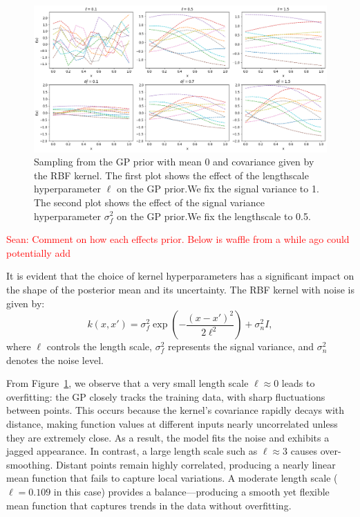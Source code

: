 \documentclass{article}
\newcommand{\Sean}[1]{{\textcolor{red}{{Sean: #1}} }}
\begin{document}
\begin{figure}[H]
    \centering
        \includegraphics[width=\textwidth]{LatexPlots/1dplots/Kernel_hyperparams.png}
        \caption{Sampling from the GP prior with mean 0 and covariance given by the RBF kernel.
        The first plot shows the effect of the lengthscale hyperparameter \(\ell\) on the GP prior.We fix the signal variance to 1.
        The second plot shows the effect of the signal variance hyperparameter \(\sigma_f^2\) on the GP prior.We fix the lengthscale to 0.5.}
    \label{fig: GPprior_hyperparams}
\end{figure}

\Sean{Comment on how each effects prior. Below is waffle from a while ago could potentially add}

\noindent
It is evident that the choice of kernel hyperparameters has a significant impact on the shape of the posterior mean and its uncertainty.
The RBF kernel with noise is given by:
\[
k(x, x') = \sigma_f^2 \exp\left( -\frac{(x - x')^2}{2\ell^2} \right) + \sigma_n^2 I,
\]
where $\ell$ controls the length scale, $\sigma_f^2$ represents the signal variance, and $\sigma_n^2$ denotes the noise level.

\noindent
From Figure~\ref{fig: GPprior_hyperparams}, we observe that a very small length scale $\ell \approx 0$ leads to overfitting:
the GP closely tracks the training data, with sharp fluctuations between points. This occurs because the kernel's covariance rapidly decays with distance,
making function values at different inputs nearly uncorrelated unless they are extremely close. As a result, the model fits the noise and exhibits a jagged appearance.
In contrast, a large length scale such as $\ell \approx 3$ causes over-smoothing. Distant points remain highly correlated,
producing a nearly linear mean function that fails to capture local variations. A moderate length scale ($\ell = 0.109$ in this case)
provides a balance—producing a smooth yet flexible mean function that captures trends in the data without overfitting.
\end{document}
